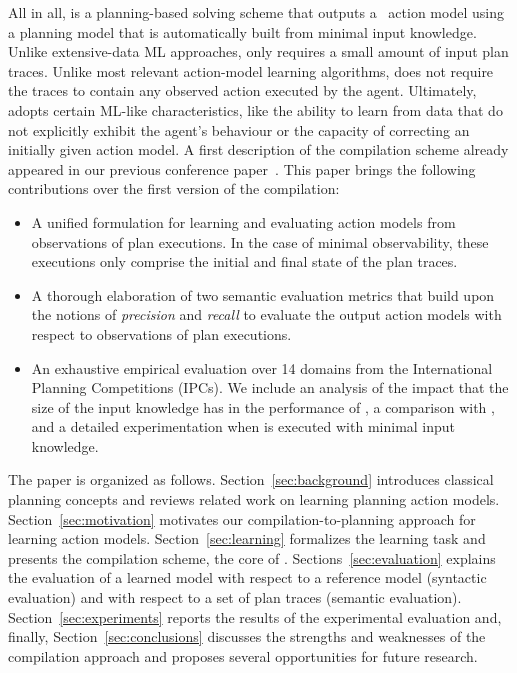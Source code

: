 All in all, \FAMA is a planning-based solving scheme that outputs a \strips\ action model using a planning model that is automatically built from minimal input knowledge. Unlike extensive-data ML approaches, \FAMA only requires a small amount of input plan traces. Unlike most relevant action-model learning algorithms, \FAMA does not require the traces to contain any observed action executed by the agent. Ultimately, \FAMA adopts certain ML-like characteristics, like the ability to learn from data that do not explicitly exhibit the agent's behaviour or the capacity of correcting an initially given action model. A first description of the \FAMA compilation scheme already appeared in our previous conference paper~\cite{aineto2018learning}. This paper brings the following contributions over the first version of the compilation:

\begin{itemize}
\item A unified formulation for learning and evaluating action models from observations of plan executions. In the case of minimal observability, these executions only comprise the initial and final state of the plan traces.
\item A thorough elaboration of two semantic evaluation metrics that build upon the notions of {\em precision} and {\em recall} to evaluate the output action models with respect to observations of plan executions.
\item An exhaustive empirical evaluation over 14 domains from the International Planning Competitions (IPCs). We include an analysis of the impact that the size of the input knowledge has in the performance of \FAMA, a comparison with \ARMS, and a detailed experimentation when \FAMA is executed with minimal input knowledge.
\end{itemize}






The paper is organized as follows. Section~\ref{sec:background} introduces classical planning concepts and reviews related work on learning planning action models. Section~\ref{sec:motivation} motivates our compilation-to-planning approach for learning action models. Section~\ref{sec:learning} formalizes the learning task and presents the compilation scheme, the core of \FAMA. Sections~\ref{sec:evaluation} explains the evaluation of a learned model with respect to a reference model (syntactic evaluation) and with respect to a set of plan traces (semantic evaluation). Section~\ref{sec:experiments} reports the results of the experimental evaluation and, finally, Section~\ref{sec:conclusions} discusses the strengths and weaknesses of the compilation approach and proposes several opportunities for future research.








